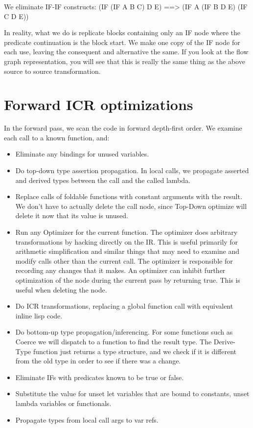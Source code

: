 We eliminate IF-IF constructs:
    (IF (IF A B C) D E) ==>
    (IF A (IF B D E) (IF C D E))

In reality, what we do is replicate blocks containing only an IF node where the
predicate continuation is the block start.  We make one copy of the IF node for
each use, leaving the consequent and alternative the same.  If you look at the
flow graph representation, you will see that this is really the same thing as
the above source to source transformation.


\section{Forward ICR optimizations}

In the forward pass, we scan the code in forward depth-first order.  We
examine each call to a known function, and:

\begin{itemize}
\item Eliminate any bindings for unused variables.

\item Do top-down type assertion propagation.  In local calls, we propagate
asserted and derived types between the call and the called lambda.

\item
    Replace calls of foldable functions with constant arguments with the
    result.  We don't have to actually delete the call node, since Top-Down
    optimize will delete it now that its value is unused.
 
\item
   Run any Optimizer for the current function.  The optimizer does arbitrary
    transformations by hacking directly on the IR.  This is useful primarily
    for arithmetic simplification and similar things that may need to examine
    and modify calls other than the current call.  The optimizer is responsible
    for recording any changes that it makes.  An optimizer can inhibit further
    optimization of the node during the current pass by returning true.  This
    is useful when deleting the node.

\item
   Do ICR transformations, replacing a global function call with equivalent
    inline lisp code.

\item
    Do bottom-up type propagation/inferencing.  For some functions such as
    Coerce we will dispatch to a function to find the result type.  The
    Derive-Type function just returns a type structure, and we check if it is
    different from the old type in order to see if there was a change.

\item
    Eliminate IFs with predicates known to be true or false.

\item
    Substitute the value for unset let variables that are bound to constants,
    unset lambda variables or functionals.

\item
    Propagate types from local call args to var refs.
\end{itemize}

